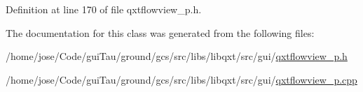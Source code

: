 Definition at line 170 of file qxtflowview\-\_\-p.\-h.



The documentation for this class was generated from the following files\-:\begin{DoxyCompactItemize}
\item 
/home/jose/\-Code/gui\-Tau/ground/gcs/src/libs/libqxt/src/gui/\hyperlink{qxtflowview__p_8h}{qxtflowview\-\_\-p.\-h}\item 
/home/jose/\-Code/gui\-Tau/ground/gcs/src/libs/libqxt/src/gui/\hyperlink{qxtflowview__p_8cpp}{qxtflowview\-\_\-p.\-cpp}\end{DoxyCompactItemize}
